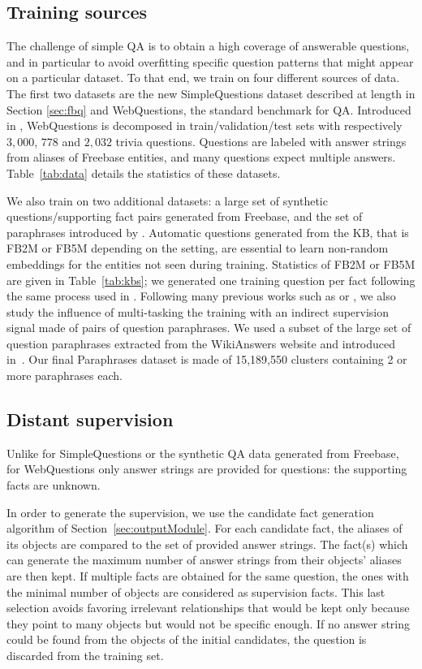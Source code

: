 \documentclass[11pt,a4paper]{article}
\newcommand{\fb}{{\sf Freebase}\xspace}
\newcommand{\wq}{{\sf WebQuestions}\xspace}
\newcommand{\fbq}{{\sf SimpleQuestions}\xspace}
\newcommand{\fbs}{{\sf FB2M}\xspace}
\newcommand{\fbb}{{\sf FB5M}\xspace}
\newcommand{\prp}{{\sf Paraphrases}\xspace}
\newcommand{\wk}{{\sc WikiAnswers}\xspace}
\begin{document}
\subsection{Training sources}
The challenge of simple QA is to obtain a high coverage of answerable
questions, and in particular to avoid overfitting specific question
patterns that might appear on a particular dataset. To that end, we
train on four different sources of data. The first two datasets are
the new \fbq dataset described at length in Section
\ref{sec:fbq} and \wq, the standard benchmark for QA.
Introduced in \cite{berant-EtAl:2013:EMNLP}, \wq is
decomposed in train/validation/test sets with respectively $3,000$,
$778$ and $2,032$ trivia questions. Questions are labeled with answer
strings from aliases of \fb entities, and many questions expect
multiple answers.
Table~\ref{tab:data} details the statistics of these datasets.

We also train on two additional datasets: a large set of synthetic
questions/supporting fact pairs generated from \fb, and the set of
paraphrases introduced by \cite{fader2014open}.
Automatic questions generated from the KB, that is \fbs or \fbb
depending on the setting, are essential to learn non-random embeddings for the
entities not seen during training.
Statistics of \fbs or \fbb are given in Table~\ref{tab:kbs}; we
generated one training question per fact following the same process
used in \cite{bordes-chopra-weston:2014:EMNLP2014}.
Following many previous works such as \cite{paralex} or
\cite{bordes2014open}, we also study the influence of multi-tasking
the training with an
indirect supervision signal made of pairs of question paraphrases.
We used a subset of the large set of question paraphrases extracted
from the \wk website and introduced in~\cite{fader2014open}.
Our final \prp dataset is made of 15,189,550 clusters containing 2 or more
paraphrases each.
\fi

\subsection{Distant supervision}
Unlike for \fbq or the synthetic QA data generated from \fb,  for
\wq only answer strings are provided for questions: the
supporting facts are unknown.

In order to generate the supervision, we use the candidate fact
generation algorithm of Section~\ref{sec:outputModule}. For each
candidate fact, the aliases of its objects are compared to the set of
provided answer strings. The fact(s) which can generate the maximum
number of answer strings from their objects' aliases are then kept. If
multiple facts are obtained for the same question, the ones with
the minimal number of objects are considered as supervision facts. This
last selection avoids favoring  irrelevant relationships that would be
kept only because they point to many objects but would not be specific
enough. If no answer string could be found from the objects of the
initial candidates, the question is discarded from the training set.
\end{document}
